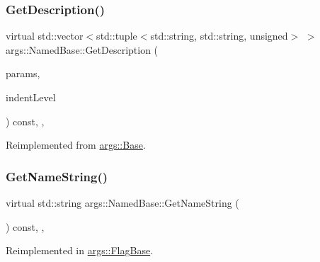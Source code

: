 \subsubsection{\texorpdfstring{Get\+Description()}{GetDescription()}}
{\footnotesize\ttfamily virtual std\+::vector$<$std\+::tuple$<$std\+::string, std\+::string, unsigned$>$ $>$ args\+::\+Named\+Base\+::\+Get\+Description (\begin{DoxyParamCaption}\item[{const \hyperlink{structargs_1_1_help_params}{Help\+Params} \&}]{params,  }\item[{const unsigned}]{indent\+Level }\end{DoxyParamCaption}) const\hspace{0.3cm}{\ttfamily [inline]}, {\ttfamily [override]}, {\ttfamily [virtual]}}



Reimplemented from \hyperlink{classargs_1_1_base_afbdf4f1ca1f61182ef0461e02e9e9ed3}{args\+::\+Base}.

\mbox{\label{classargs_1_1_named_base_a3c597a489d3ccc74937682407c08b3f7}} 
\subsubsection{\texorpdfstring{Get\+Name\+String()}{GetNameString()}}
{\footnotesize\ttfamily virtual std\+::string args\+::\+Named\+Base\+::\+Get\+Name\+String (\begin{DoxyParamCaption}\item[{const \hyperlink{structargs_1_1_help_params}{Help\+Params} \&}]{ }\end{DoxyParamCaption}) const\hspace{0.3cm}{\ttfamily [inline]}, {\ttfamily [protected]}, {\ttfamily [virtual]}}



Reimplemented in \hyperlink{classargs_1_1_flag_base_a61db383104c1987904bcd331d8b3be76}{args\+::\+Flag\+Base}.

\mbox{\label{classargs_1_1_named_base_a084a776592a24153f1f0aaf28d81f495}} 
